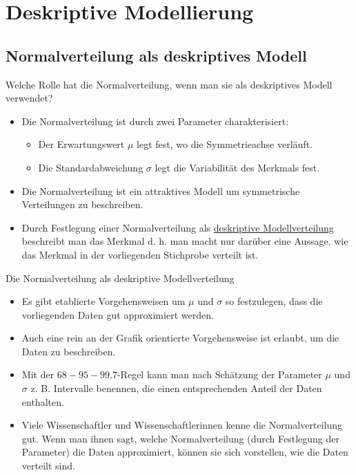 \documentclass[usenames,dvipsnames,handout]{beamer}
\begin{document}
\section{Deskriptive Modellierung}

\subsection{Normalverteilung als deskriptives Modell}
\begin{frame}{Welche Rolle hat die Normalverteilung,
wenn man sie als deskriptives Modell verwendet?}
\begin{itemize}
\item{Die Normalverteilung ist durch zwei Parameter charakterisiert:}\pause
\begin{itemize}
\item{Der Erwartungswert $\mu$ legt fest, wo die Symmetrieachse verläuft.}\pause
\item{Die Standardabweichung $\sigma$ legt die Variabilität des Merkmals fest.}\pause
\end{itemize}
\item{Die Normalverteilung ist ein attraktives Modell um symmetrische Verteilungen
zu beschreiben.}\pause
\item{Durch Festlegung einer Normalverteilung
als \underline{deskriptive Modellverteilung} beschreibt man das Merkmal d. h. man macht nur darüber eine Aussage,
wie das Merkmal in der vorliegenden Stichprobe verteilt ist.}
\end{itemize}
\end{frame}





\begin{frame}{Die Normalverteilung als deskriptive Modellverteilung}
\begin{itemize}
\item{Es gibt etablierte Vorgehensweisen um $\mu$
und $\sigma$ so festzulegen, dass die vorliegenden Daten gut approximiert 
werden.}\pause
\item{Auch eine rein an der Grafik
orientierte Vorgehensweise ist erlaubt, um die Daten zu beschreiben.}\pause
\item{Mit der $68-95-99.7$-Regel kann man nach Schätzung der Parameter $\mu$
und $\sigma$  z. B. Intervalle benennen, die 
einen entsprechenden Anteil der Daten enthalten.}\pause
\item{Viele Wissenschaftler und Wissenschaftlerinnen kenne die Normalverteilung gut.
Wenn man ihnen sagt, welche Normalverteilung (durch Festlegung
der Parameter) die Daten approximiert, können
sie sich vorstellen, wie die Daten verteilt sind.}
\end{itemize}
\end{frame}
\end{document}
